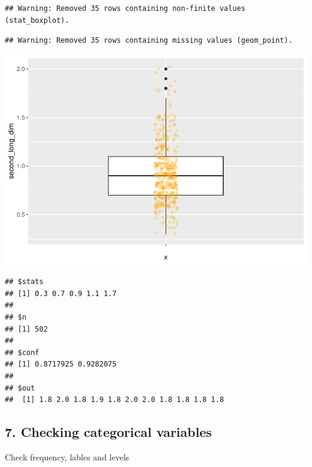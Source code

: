 \documentclass[]{article}
\newenvironment{Shaded}{\begin{snugshade}}{\end{snugshade}}
\newcommand{\KeywordTok}[1]{\textcolor[rgb]{0.13,0.29,0.53}{\textbf{#1}}}
\newcommand{\StringTok}[1]{\textcolor[rgb]{0.31,0.60,0.02}{#1}}
\newcommand{\OperatorTok}[1]{\textcolor[rgb]{0.81,0.36,0.00}{\textbf{#1}}}
\newcommand{\NormalTok}[1]{#1}
\begin{document}
\begin{verbatim}
## Warning: Removed 35 rows containing non-finite values (stat_boxplot).
\end{verbatim}

\begin{verbatim}
## Warning: Removed 35 rows containing missing values (geom_point).
\end{verbatim}

\includegraphics{figs/render-unnamed-chunk-26-1.pdf}

\begin{Shaded}
\end{Shaded}

\begin{verbatim}
## $stats
## [1] 0.3 0.7 0.9 1.1 1.7
## 
## $n
## [1] 502
## 
## $conf
## [1] 0.8717925 0.9282075
## 
## $out
##  [1] 1.8 2.0 1.8 1.9 1.8 2.0 2.0 1.8 1.8 1.8 1.8
\end{verbatim}

\subsection{7. Checking categorical
variables}\label{checking-categorical-variables}

Check frequency, lables and levels

\begin{Shaded}
\end{Shaded}
\end{document}
